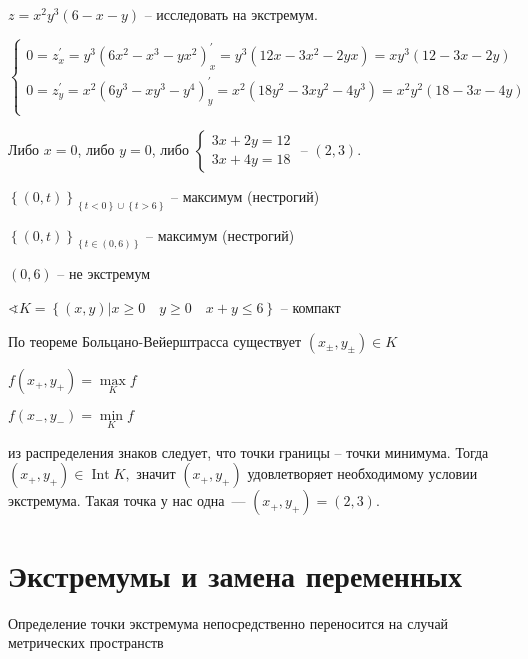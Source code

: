 \documentclass{book}
\newcommand{\p}[1]{#1^{\prime}}
\theoremstyle{definition}
\newcommand{\incfig}[1]{%
    \def\svgwidth{\columnwidth}
    {#1.pdf_tex}
}
\DeclareMathOperator{\Int}{Int}
\begin{document}
        \begin{problem}
            $z = x^2y^3(6-x-y)$ -- исследовать на экстремум. 

            $\begin{cases}
                0 = \p z_x = y^3(6x^2-x^3-yx^2\p )_x = y^3(12x-3x^2-2yx) = xy^3(12-3x-2y)\\
                0 = \p z_y = x^2(6y^3-xy^3-y^4 \p )_y = x^2(18y^2-3xy^2-4y^3)= x^2y^2(18-3x-4y)\\
            \end{cases}$ 

           Либо $x=0$, либо  $y=0$, либо  $\begin{cases}
               3x + 2y = 12\\ 3x+4y=18
           \end{cases}$ -- $(2, 3)$.

$\left\{ (0, t) \right\} _{\left\{ t<0 \right\} \cup \left\{ t>6 \right\} }$ -- максимум (нестрогий)

$\left\{ (0, t) \right\} _{\left\{ t\in (0,6) \right\} }$ -- максимум (нестрогий)

$(0,6)$ -- не экстремум

$\sphericalangle K = \left\{ (x, y)|x\geqslant 0\quad y\geqslant 0\quad x+y\leqslant 6 \right\} $ -- компакт

По теореме Больцано-Вейерштрасса существует $\left( x_{\pm}, y_{\pm} \right)\in K $ 

$f\left( x_+, y_+ \right)  = \max\limits_K f$

$f\left(x_-, y_-  \right) = \min\limits_Kf $ 

из распределения знаков следует, что точки границы -- точки минимума.
Тогда $(x_+, y_+)\in \Int K,$ значит $(x_+, y_+)$ удовлетворяет необходимому условии экстремума. 
Такая точка у нас одна~---  $(x_+, y_+) = (2, 3)$.
        \end{problem}

        \section{Экстремумы и замена переменных}
        Определение точки экстремума непосредственно переносится на случай метрических пространств
\end{document}
